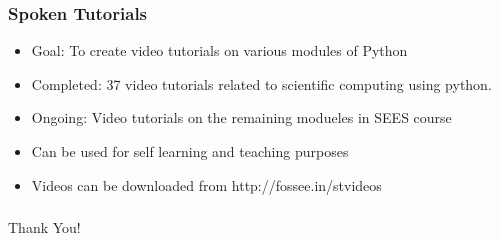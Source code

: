 \documentclass{beamer}
\begin{document}
\begin{frame}
	\frametitle{Spoken Tutorials}
	\begin{itemize}
	\item Goal: To create video tutorials on various modules of Python
	\item Completed: 37 video tutorials related to scientific computing using python.
	\item Ongoing: Video tutorials on the remaining modueles in SEES course
	\item Can be used for self learning and teaching purposes
	\item Videos can be downloaded from http://fossee.in/stvideos	
	\end{itemize}
\end{frame}


\begin{frame}
\frametitle{}   
  \begin{center}
    \Huge{Thank You!}
  \end{center}
\end{frame}
\end{document}
